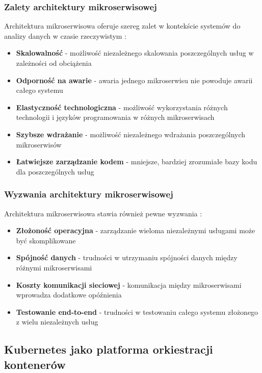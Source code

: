 \subsubsection{Zalety architektury mikroserwisowej}
\label{subsubsec:zalety_mikroserwisow}

Architektura mikroserwisowa oferuje szereg zalet w kontekście systemów do analizy danych w czasie rzeczywistym \citep{microservice_benefits}:

\begin{itemize}
    \item \textbf{Skalowalność} - możliwość niezależnego skalowania poszczególnych usług w zależności od obciążenia
    \item \textbf{Odporność na awarie} - awaria jednego mikroserwisu nie powoduje awarii całego systemu
    \item \textbf{Elastyczność technologiczna} - możliwość wykorzystania różnych technologii i języków programowania w różnych mikroserwisach
    \item \textbf{Szybsze wdrażanie} - możliwość niezależnego wdrażania poszczególnych mikroserwisów
    \item \textbf{Łatwiejsze zarządzanie kodem} - mniejsze, bardziej zrozumiałe bazy kodu dla poszczególnych usług
\end{itemize}

\subsubsection{Wyzwania architektury mikroserwisowej}
\label{subsubsec:wyzwania_mikroserwisow}

Architektura mikroserwisowa stawia również pewne wyzwania \citep{microservice_challenges}:

\begin{itemize}
    \item \textbf{Złożoność operacyjna} - zarządzanie wieloma niezależnymi usługami może być skomplikowane
    \item \textbf{Spójność danych} - trudności w utrzymaniu spójności danych między różnymi mikroserwisami
    \item \textbf{Koszty komunikacji sieciowej} - komunikacja między mikroserwisami wprowadza dodatkowe opóźnienia
    \item \textbf{Testowanie end-to-end} - trudności w testowaniu całego systemu złożonego z wielu niezależnych usług
\end{itemize}

\subsection{Kubernetes jako platforma orkiestracji kontenerów}
\label{subsec:kubernetes}

